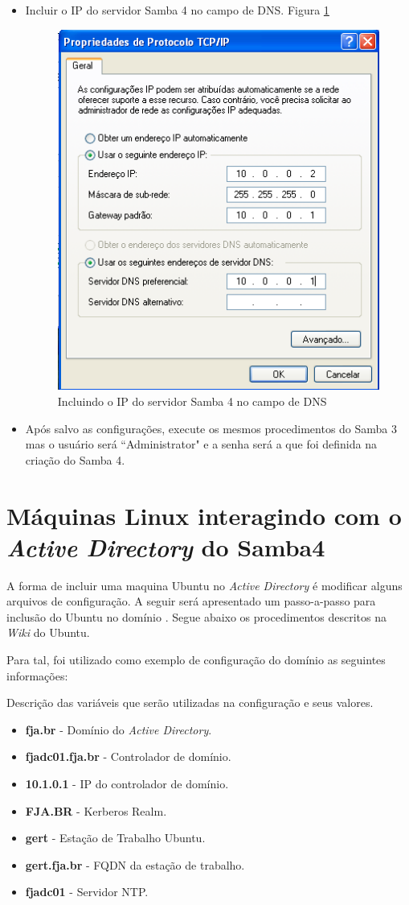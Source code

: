\begin{itemize}
	\item Incluir o IP do servidor Samba 4 no campo de DNS. Figura \ref{propriedades_tcpip}
	\begin{figure}[ht]
			\centering
	 		\includegraphics[width=0.5 \textwidth]{figuras/propriedades_tcpip}
			\caption{Incluindo o IP do servidor Samba 4 no campo de DNS}
			\label{propriedades_tcpip}
	\end{figure}
	
	\item Após salvo as configurações, execute os mesmos procedimentos do Samba 3 mas o usuário será ``Administrator" e a senha será a que foi definida na criação do Samba 4.
	
\end{itemize}

\section{Máquinas Linux interagindo com o \textit{Active Directory} do  Samba4}

A forma de incluir uma maquina Ubuntu no \textit{Active Directory} é modificar alguns arquivos de configuração. A seguir será apresentado um passo-a-passo para inclusão do Ubuntu no domínio \cite{UBUNTU-WIKI}. Segue abaixo os procedimentos descritos na \textit{Wiki} do Ubuntu.

Para tal, foi utilizado como exemplo de configuração do domínio as seguintes informações:

Descrição das variáveis que serão utilizadas na configuração e seus valores.

\begin{itemize}
	\item \textbf{fja.br} -  Domínio do \textit{Active Directory}.
	\item \textbf{fjadc01.fja.br} - Controlador de domínio.
	\item \textbf{10.1.0.1} - IP do controlador de domínio.
	\item \textbf{FJA.BR} - Kerberos Realm.
	\item \textbf{gert} - Estação de Trabalho Ubuntu.
	\item \textbf{gert.fja.br} - FQDN da estação de trabalho.
	\item \textbf{fjadc01} - Servidor NTP.
\end{itemize}

